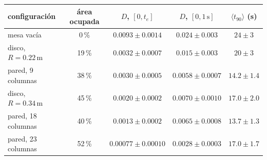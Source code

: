 \begin{tabular}{lcccc}
  \hline
  configuración & área ocupada & $D$, $[0, t_e]$ & $D$, $[0, 1\,\mathrm{s}]$ & $\langle t_{90}\rangle$ (s) \\
  \hline
  mesa vacía & 0\,\% & $0.0093 \pm 0.0014$ & $0.024 \pm 0.003$ & $24 \pm 3$ \\
  disco, $R = 0.22\,\mathrm{m}$ & 19\,\% & $0.0032 \pm 0.0007$ & $0.015 \pm 0.003$ & $20 \pm 3$ \\
  pared, 9 columnas & 38\,\% & $0.0030 \pm 0.0005$ & $0.0058 \pm 0.0007$ & $14.2 \pm 1.4$ \\
  disco, $R = 0.34\,\mathrm{m}$ & 45\,\% & $0.0020 \pm 0.0002$ & $0.0070 \pm 0.0010$ & $17.0 \pm 2.0$ \\
  pared, 18 columnas & 40\,\% & $0.0013 \pm 0.0002$ & $0.0065 \pm 0.0008$ & $13.7 \pm 1.3$ \\
  pared, 23 columnas & 52\,\% & $0.00077 \pm 0.00010$ & $0.0028 \pm 0.0003$ & $17.0 \pm 1.7$ \\
  \hline
\end{tabular}
